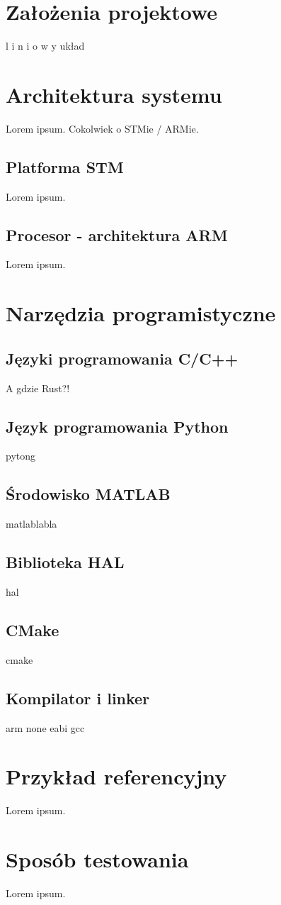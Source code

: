 \section{Założenia projektowe} \label{sec:assumptions}
l i n i o w y układ

\section{Architektura systemu} \label{sec:system}
Lorem ipsum. Cokolwiek o STMie / ARMie.

\subsection{Platforma STM} \label{sec:stm}
Lorem ipsum.

\subsection{Procesor - architektura ARM} \label{sec:arm}
Lorem ipsum.

\section{Narzędzia programistyczne} \label{sec:prog}

\subsection{Języki programowania C/C++} \label{sec:cpp}
A gdzie Rust?!

\subsection{Język programowania Python} \label{sec:python}
pytong

\subsection{Środowisko MATLAB} \label{sec:matlab}
matlablabla

\subsection{Biblioteka HAL} \label{sec:hal}
hal

\subsection{CMake} \label{sec:cmake}
cmake

\subsection{Kompilator i linker} \label{sec:gcc}
arm none eabi gcc

\section{Przykład referencyjny} \label{sec:ref}
Lorem ipsum.

\section{Sposób testowania} \label{sec:tests}
Lorem ipsum.

